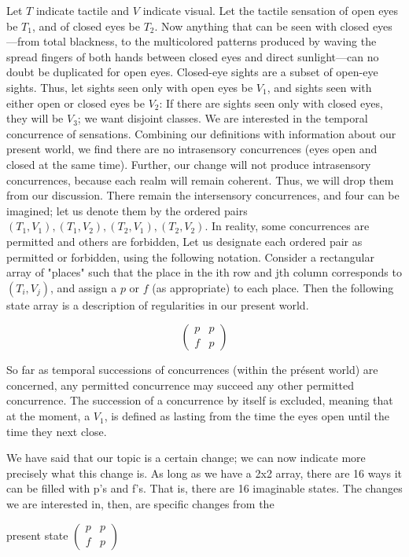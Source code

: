 \documentclass[10pt,twoside]{memoir}
\begin{document}
\begin{enumerate}
{\begin{enumerate}
Let $T$ indicate tactile and $V$ indicate visual. Let the tactile sensation of 
open eyes be $T_1$, and of closed eyes be $T_2$. Now anything that can be seen 
with closed eyes---from total blackness, to the multicolored patterns produced 
by waving the spread fingers of both hands between closed eyes and direct 
sunlight---can no doubt be duplicated for open eyes. Closed-eye sights are a 
subset of open-eye sights. Thus, let sights seen only with open eyes be $V_1$, 
and sights seen with either open or closed eyes be $V_2$: If there are sights seen 
only with closed eyes, they will be $V_3$; we want disjoint classes. We are 
interested in the temporal concurrence of sensations. Combining our 
definitions with information about our present world, we find there are no 
intrasensory concurrences (eyes open and closed at the same time). Further, 
our change will not produce intrasensory concurrences, because each realm 
will remain coherent. Thus, we will drop them from our discussion. There 
remain the intersensory concurrences, and four can be imagined; let us 
denote them by the ordered pairs $(T_1, V_1), (T_1, V_2), (T_2, V_1), (T_2, V_2)$. In 
reality, some concurrences are permitted and others are forbidden, Let us 
designate each ordered pair as permitted or forbidden, using the following 
notation. Consider a rectangular array of "places" such that the place in the 
ith row and jth column corresponds to $(T_i, V_j)$, and assign a $p$ or $f$ (as 
appropriate) to each place. Then the following state array is a description of 
regularities in our present world. 

$$\begin{pmatrix}
	p & p\\
	f & p 
\end{pmatrix}$$


So far as temporal successions of concurrences (within the présent 
world) are concerned, any permitted concurrence may succeed any other 
permitted concurrence. The succession of a concurrence by itself is 
excluded, meaning that at the moment, a $V_1$, is defined as lasting from the 
time the eyes open until the time they next close. 

We have said that our topic is a certain change; we can now indicate 
more precisely what this change is. As long as we have a 2x2 array, there are 
16 ways it can be filled with p's and f's. That is, there are 16 imaginable 
states. The changes we are interested in, then, are specific changes from the 


present state
$\begin{pmatrix}
	p & p \\
	f & p
\end{pmatrix}$


\end{enumerate}}
\end{enumerate}
\end{document}
